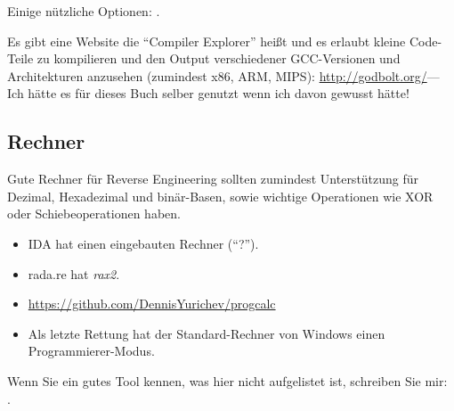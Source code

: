 Einige nützliche Optionen: .

Es gibt eine Website die ``Compiler Explorer'' heißt und es erlaubt kleine Code-Teile zu kompilieren
und den Output verschiedener GCC-Versionen und Architekturen anzusehen (zumindest x86, ARM, MIPS):
\url{http://godbolt.org/}---Ich hätte es für dieses Buch selber genutzt wenn ich davon gewusst hätte!

\subsection{Rechner}

Gute Rechner für Reverse Engineering sollten zumindest Unterstützung für Dezimal, Hexadezimal und binär-Basen,
sowie wichtige Operationen wie XOR oder Schiebeoperationen haben.

\begin{itemize}

\item IDA hat einen eingebauten Rechner (``?'').

\item rada.re hat \emph{rax2}.

\item \url{https://github.com/DennisYurichev/progcalc}

\item Als letzte Rettung hat der Standard-Rechner von Windows einen Programmierer-Modus.

\end{itemize}


Wenn Sie ein gutes Tool kennen, was hier nicht aufgelistet ist, schreiben Sie mir:\\
\TT{\EMAIL}.
